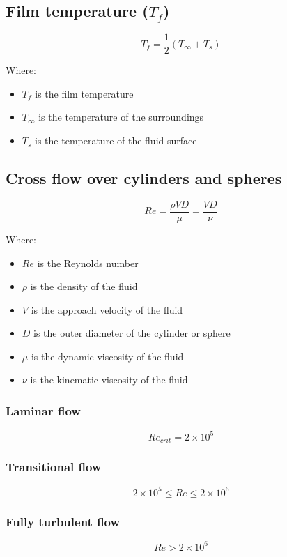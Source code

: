 \documentclass[11pt]{article}
\begin{document}
\subsection{Film temperature (\(T_f\))}
\label{sec:org2bbb4d2}
\[T_f = \frac{1}{2} (T_{\infty} + T_s)\]

Where:
\begin{itemize}
\item \(T_f\) is the film temperature
\item \(T_{\infty}\) is the temperature of the surroundings
\item \(T_s\) is the temperature of the fluid surface
\end{itemize}

\subsection{Cross flow over cylinders and spheres}
\label{sec:orgac0f32c}
\[Re = \frac{\rho VD}{\mu} = \frac{VD}{\nu}\]

Where:
\begin{itemize}
\item \(Re\) is the Reynolds number
\item \(\rho\) is the density of the fluid
\item \(V\) is the approach velocity of the fluid
\item \(D\) is the outer diameter of the cylinder or sphere
\item \(\mu\) is the dynamic viscosity of the fluid
\item \(\nu\) is the kinematic viscosity of the fluid
\end{itemize}

\subsubsection{Laminar flow}
\label{sec:org60e9f67}
\[Re_{crit} = 2 \times 10^5\]

\subsubsection{Transitional flow}
\label{sec:org46f4139}
\[2 \times 10^5 \le Re \le 2 \times 10^6\]

\subsubsection{Fully turbulent flow}
\label{sec:org0fae348}
\[Re > 2 \times 10^6\]
\end{document}
